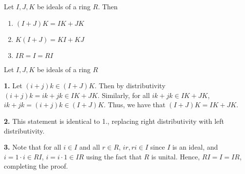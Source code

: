 \documentclass[12pt, a4paper, twoside, openright, titlepage]{book}
\begin{document}
\begin{rmk}{}{}
    Let $I,J, K$ be ideals of a ring $R$. Then \begin{enumerate}
        \item $(I+J)K = IK + JK$
        \item $K(I+J) = KI + KJ$
        \item $IR = I = RI$
    \end{enumerate}
    \begin{proof*}{}{}
        Let $I,J,K$ be ideals of a ring $R$
        
        \textbf{1.} Let $(i+j)k \in (I+J)K$. Then by distributivity $(i+j)k = ik+jk \in IK+JK$. Similarly, for all $ik+jk \in IK+JK$, $ik+jk = (i+j)k \in (I+J)K$. Thus, we have that $(I+J)K = IK+JK$.
        
        \textbf{2.} This statement is identical to 1., replacing right distributivity with left distributivity.
        
        \textbf{3.} Note that for all $i \in I$ and all $r \in R$, $ir,ri \in I$ since $I$ is an ideal, and $i = 1\cdot i \in RI$, $i = i\cdot 1 \in IR$ using the fact that $R$ is unital. Hence, $RI = I  = IR$, completing the proof.
    \end{proof*}
    \label{idealProps}
\end{rmk}
\end{document}
